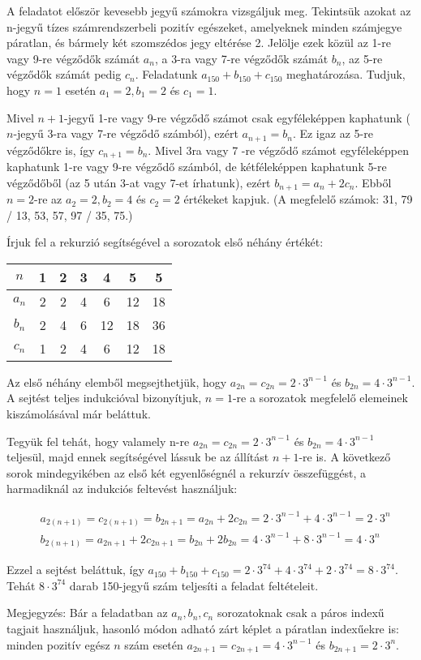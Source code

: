 \begin{solution}
A feladatot először kevesebb jegyű számokra vizsgáljuk meg. Tekintsük
azokat az n-jegyű tízes számrendszerbeli pozitív egészeket, amelyeknek
minden számjegye páratlan, és bármely két szomszédos jegy eltérése
2. Jelölje ezek közül az 1-re vagy 9-re végződők számát $a_{n}$,
a 3-ra vagy 7-re végződők számát $b_{n}$, az 5-re végződők számát
pedig $c_{n}$. Feladatunk $a_{150}+b_{150}+c_{150}$ meghatározása.
Tudjuk, hogy $n=1$ esetén $a_{1}=2,b_{1}=2$ és $c_{1}=1$.

Mivel $n+1$-jegyű 1-re vagy 9-re végződő számot csak egyféleképpen
kaphatunk ( $n$-jegyű 3-ra vagy 7-re végződő számból), ezért $a_{n+1}=b_{n}$.
Ez igaz az 5-re végződőkre is, így $c_{n+1}=b_{n}$. Mivel 3ra vagy
7 -re végződő számot egyféleképpen kaphatunk 1-re vagy 9-re végződő
számból, de kétféleképpen kaphatunk 5-re végződőből (az 5 után 3-at
vagy 7-et írhatunk), ezért $b_{n+1}=a_{n}+2c_{n}$. Ebből $n=2$-re
az $a_{2}=2,b_{2}=4$ és $c_{2}=2$ értékeket kapjuk. (A megfelelő
számok: 31, 79 / 13, 53, 57, 97 / 35, 75.)

Írjuk fel a rekurzió segítségével a sorozatok első néhány értékét:
\begin{center}
\begin{tabular}{|c|c|c|c|c|c|c|}
\hline 
$n$ & 1 & 2 & 3 & 4 & 5 & 5\tabularnewline
\hline 
$a_{n}$ & 2 & 2 & 4 & 6 & 12 & 18\tabularnewline
\hline 
$b_{n}$ & 2 & 4 & 6 & 12 & 18 & 36\tabularnewline
\hline 
$c_{n}$ & 1 & 2 & 4 & 6 & 12 & 18\tabularnewline
\hline 
\end{tabular}
\par\end{center}
Az első néhány elemből megsejthetjük, hogy $a_{2n}=c_{2n}=2\cdot3^{n-1}$
és $b_{2n}=4\cdot3^{n-1}$. A sejtést teljes indukcióval bizonyítjuk,
$n=1$-re a sorozatok megfelelő elemeinek kiszámolásával már beláttuk.

Tegyük fel tehát, hogy valamely n-re $a_{2n}=c_{2n}=2\cdot3^{n-1}$
és $b_{2n}=4\cdot3^{n-1}$ teljesül, majd ennek segítségével lássuk
be az állítást $n+1$-re is. A következő sorok mindegyikében az első
két egyenlőségnél a rekurzív összefüggést, a harmadiknál az indukciós
feltevést használjuk:

\[
\begin{aligned} & a_{2(n+1)}=c_{2(n+1)}=b_{2n+1}=a_{2n}+2c_{2n}=2\cdot3^{n-1}+4\cdot3^{n-1}=2\cdot3^{n}\\
 & b_{2(n+1)}=a_{2n+1}+2c_{2n+1}=b_{2n}+2b_{2n}=4\cdot3^{n-1}+8\cdot3^{n-1}=4\cdot3^{n}
\end{aligned}
\]

Ezzel a sejtést beláttuk, így $a_{150}+b_{150}+c_{150}=2\cdot3^{74}+4\cdot3^{74}+2\cdot3^{74}=8\cdot3^{74}$.
Tehát $8\cdot3^{74}$ darab 150-jegyű szám teljesíti a feladat feltételeit.

Megjegyzés: Bár a feladatban az $a_{n},b_{n},c_{n}$ sorozatoknak
csak a páros indexű tagjait használjuk, hasonló módon adható zárt
képlet a páratlan indexűekre is: minden pozitív egész $n$ szám esetén
$a_{2n+1}=c_{2n+1}=4\cdot3^{n-1}$ és $b_{2n+1}=2\cdot3^{n}$.
\end{solution}
